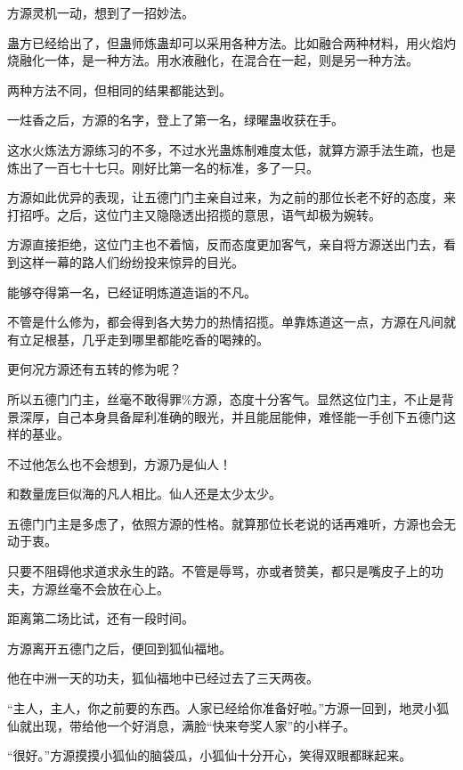
\begin{this_body}

方源灵机一动，想到了一招妙法。

蛊方已经给出了，但蛊师炼蛊却可以采用各种方法。比如融合两种材料，用火焰灼烧融化一体，是一种方法。用水液融化，在混合在一起，则是另一种方法。

两种方法不同，但相同的结果都能达到。

一炷香之后，方源的名字，登上了第一名，绿曜蛊收获在手。

这水火炼法方源练习的不多，不过水光蛊炼制难度太低，就算方源手法生疏，也是炼出了一百七十七只。刚好比第一名的标准，多了一只。

方源如此优异的表现，让五德门门主亲自过来，为之前的那位长老不好的态度，来打招呼。之后，这位门主又隐隐透出招揽的意思，语气却极为婉转。

方源直接拒绝，这位门主也不着恼，反而态度更加客气，亲自将方源送出门去，看到这样一幕的路人们纷纷投来惊异的目光。

能够夺得第一名，已经证明炼道造诣的不凡。

不管是什么修为，都会得到各大势力的热情招揽。单靠炼道这一点，方源在凡间就有立足根基，几乎走到哪里都能吃香的喝辣的。

更何况方源还有五转的修为呢？

所以五德门门主，丝毫不敢得罪\%方源，态度十分客气。显然这位门主，不止是背景深厚，自己本身具备犀利准确的眼光，并且能屈能伸，难怪能一手创下五德门这样的基业。

不过他怎么也不会想到，方源乃是仙人！

和数量庞巨似海的凡人相比。仙人还是太少太少。

五德门门主是多虑了，依照方源的性格。就算那位长老说的话再难听，方源也会无动于衷。

只要不阻碍他求道求永生的路。不管是辱骂，亦或者赞美，都只是嘴皮子上的功夫，方源丝毫不会放在心上。

距离第二场比试，还有一段时间。

方源离开五德门之后，便回到狐仙福地。

他在中洲一天的功夫，狐仙福地中已经过去了三天两夜。

“主人，主人，你之前要的东西。人家已经给你准备好啦。”方源一回到，地灵小狐仙就出现，带给他一个好消息，满脸“快来夸奖人家”的小样子。

“很好。”方源摸摸小狐仙的脑袋瓜，小狐仙十分开心，笑得双眼都眯起来。


\end{this_body}
